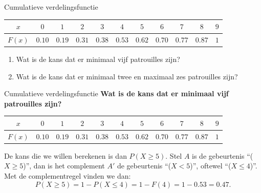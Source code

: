 \begin{frame}{Cumulatieve verdelingsfunctie}
    
   {\small
        \begin{center}
            \begin{tabular}{*{11}{c}}
                \toprule
                    $x$     & $0$ & $1$ & $2$ & $3$ & $4$ & $5$ & $6$ & $7$ & $8$ & $9$ \\
                \midrule
                    $F(x)$  & $0.10$ & $0.19$ & $0.31$ & $0.38$ & $0.53$ & $0.62$ & $0.70$ & $0.77$ & $0.87$ & $1$ \\
                \bottomrule
            \end{tabular}
        \end{center}
    }
    \vfill
    \begin{enumerate}
        \item Wat is de kans dat er minimaal vijf patrouilles zijn?
        \item Wat is de kans dat er minimaal twee en maximaal zes patrouilles zijn?
    \end{enumerate}
\end{frame}

\begin{frame}{Cumulatieve verdelingsfunctie}
    \textbf{Wat is de kans dat er minimaal vijf patrouilles zijn?}
    {\small
        \begin{center}
            \begin{tabular}{*{11}{c}}
                \toprule
                    $x$     & $0$ & $1$ & $2$ & $3$ & $4$ & $5$ & $6$ & $7$ & $8$ & $9$ \\
                \midrule
                    $F(x)$  & $0.10$ & $0.19$ & $0.31$ & $0.38$ & $0.53$ & $0.62$ & $0.70$ & $0.77$ & $0.87$ & $1$ \\
                \bottomrule
            \end{tabular}
        \end{center}
    }
    \vfill
    De kans die we willen berekenen is dan $P(X \geq 5)$.
    \vfill\pause
    Stel $A$ is de gebeurtenis \enquote{($X \ge 5$)}, dan is het complement $A'$ de gebeurtenis \enquote{($X < 5$)}, oftewel \enquote{($X \leq 4$)}.
    \vfill\pause
    Met de complementregel vinden we dan:
    \[
        P(X \geq 5) = 1 - P(X \leq 4) = 1 - F(4) = 1 - 0.53 = 0.47.
    \]
\end{frame}

